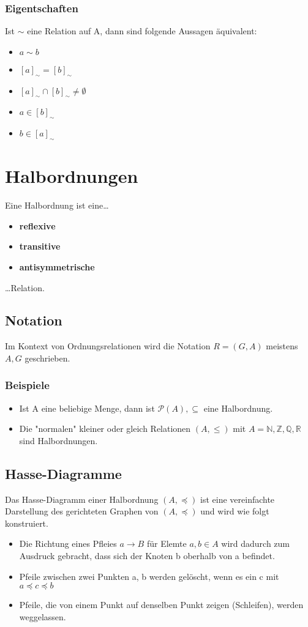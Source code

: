\subsubsection{Eigentschaften}
Ist $\sim$ eine Relation auf A, dann sind folgende Aussagen äquivalent:
\begin{itemize}
    \item $a \sim b$
    \item $[a]_{\sim} = [b]_{\sim}$
    \item $[a]_{\sim} \cap [b]_{\sim} \neq \emptyset$
    \item $a \in [b]_{\sim}$
    \item $b \in [a]_{\sim}$
\end{itemize}
\section{Halbordnungen}
Eine Halbordnung ist eine\dots
\begin{itemize}
    \item \textbf{reflexive}
    \item \textbf{transitive}
    \item \textbf{antisymmetrische}
\end{itemize}
\dots Relation.
\subsection{Notation}
Im Kontext von Ordnungsrelationen wird die Notation $R = (G,A)$ meistens $A,G$ geschrieben.
\subsubsection{Beispiele}
\begin{itemize}
    \item Ist A eine beliebige Menge, dann ist $\mathcal{P}(A),\subseteq$ eine Halbordnung.
    \item Die "normalen" kleiner oder gleich Relationen $(A,\leq)$ mit $A=\mathbb{N,Z,Q,R}$ sind Halbordnungen.
\end{itemize}
\subsection{Hasse-Diagramme}
Das Hasse-Diagramm einer Halbordnung $(A, \preceq)$ ist eine
vereinfachte Darstellung des gerichteten Graphen von $(A, \preceq)$ und
wird wie folgt konstruiert.
\begin{itemize}
    \item Die Richtung eines Pfleies $a \rightarrow B$ für Elemte $a,b \in A$ wird 
    dadurch zum Ausdruck gebracht, dass sich der Knoten b oberhalb von a befindet.
    \item Pfeile zwischen zwei Punkten a, b werden gelöscht, wenn es ein
    c mit $a \preceq c \preceq b$
    \item Pfeile, die von einem Punkt auf denselben Punkt zeigen (Schleifen), werden weggelassen.
\end{itemize}

